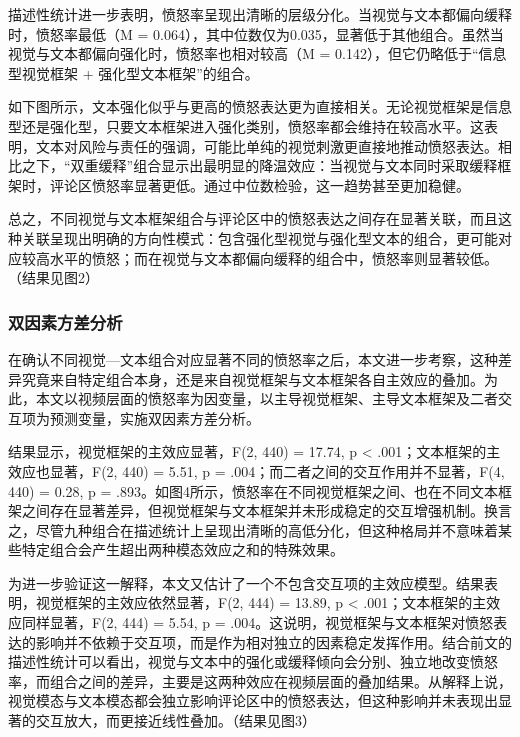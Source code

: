 \documentclass[
]{article}
\begin{document}
描述性统计进一步表明，愤怒率呈现出清晰的层级分化。当视觉与文本都偏向缓释时，愤怒率最低（M
=
0.064），其中位数仅为0.035，显著低于其他组合。虽然当视觉与文本都偏向强化时，愤怒率也相对较高（M
= 0.142），但它仍略低于``信息型视觉框架 + 强化型文本框架''的组合。

如下图所示，文本强化似乎与更高的愤怒表达更为直接相关。无论视觉框架是信息型还是强化型，只要文本框架进入强化类别，愤怒率都会维持在较高水平。这表明，文本对风险与责任的强调，可能比单纯的视觉刺激更直接地推动愤怒表达。相比之下，``双重缓释''组合显示出最明显的降温效应：当视觉与文本同时采取缓释框架时，评论区愤怒率显著更低。通过中位数检验，这一趋势甚至更加稳健。

总之，不同视觉与文本框架组合与评论区中的愤怒表达之间存在显著关联，而且这种关联呈现出明确的方向性模式：包含强化型视觉与强化型文本的组合，更可能对应较高水平的愤怒；而在视觉与文本都偏向缓释的组合中，愤怒率则显著较低。（结果见图2）

\subsubsection{双因素方差分析}\label{ux53ccux56e0ux7d20ux65b9ux5deeux5206ux6790}

在确认不同视觉---文本组合对应显著不同的愤怒率之后，本文进一步考察，这种差异究竟来自特定组合本身，还是来自视觉框架与文本框架各自主效应的叠加。为此，本文以视频层面的愤怒率为因变量，以主导视觉框架、主导文本框架及二者交互项为预测变量，实施双因素方差分析。

结果显示，视觉框架的主效应显著，F(2, 440) = 17.74, p \textless{}
.001；文本框架的主效应也显著，F(2, 440) = 5.51, p =
.004；而二者之间的交互作用并不显著，F(4, 440) = 0.28, p =
.893。如图4所示，愤怒率在不同视觉框架之间、也在不同文本框架之间存在显著差异，但视觉框架与文本框架并未形成稳定的交互增强机制。换言之，尽管九种组合在描述统计上呈现出清晰的高低分化，但这种格局并不意味着某些特定组合会产生超出两种模态效应之和的特殊效果。

为进一步验证这一解释，本文又估计了一个不包含交互项的主效应模型。结果表明，视觉框架的主效应依然显著，F(2,
444) = 13.89, p \textless{} .001；文本框架的主效应同样显著，F(2, 444) =
5.54, p =
.004。这说明，视觉框架与文本框架对愤怒表达的影响并不依赖于交互项，而是作为相对独立的因素稳定发挥作用。结合前文的描述性统计可以看出，视觉与文本中的强化或缓释倾向会分别、独立地改变愤怒率，而组合之间的差异，主要是这两种效应在视频层面的叠加结果。从解释上说，视觉模态与文本模态都会独立影响评论区中的愤怒表达，但这种影响并未表现出显著的交互放大，而更接近线性叠加。（结果见图3）
\end{document}
